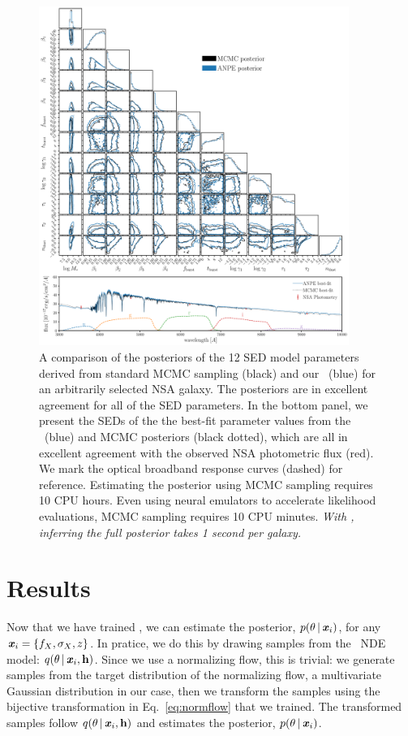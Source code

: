 \begin{figure}
\begin{center}
    \includegraphics[width=0.9\textwidth]{figs/corner.pdf}
    \caption{\label{fig:corner}
    A comparison of the posteriors of the 12 SED model parameters derived from
    standard MCMC sampling (black) and our \sedflow~(blue) for an arbitrarily
    selected NSA galaxy.
    The posteriors are in excellent agreement for all of the SED parameters. 
    In the bottom panel, we present the SEDs of the the best-fit parameter
    values from the \sedflow~(blue) and MCMC posteriors (black dotted), which
    are all in excellent agreement with the observed NSA photometric flux
    (red). 
    We mark the optical broadband response curves (dashed) for reference. 
    Estimating the posterior using MCMC sampling requires 10 CPU hours. 
    Even using neural emulators to accelerate likelihood evaluations, MCMC
    sampling requires 10 CPU minutes. 
    \emph{With \sedflow, inferring the full posterior takes 1 second per
    galaxy.}
    }
\end{center}
\end{figure}

\section{Results} \label{sec:results}
Now that we have trained \sedflow, we can estimate the posterior,
$p(\theta\,|\, \textbf{\textit{x}}_i)$, for any $\textbf{\textit{x}}_i = \{f_X, \sigma_X, z \}$. 
In pratice, we do this by drawing samples from the \sedflow~NDE model:
$q(\theta\,|\, \textbf{\textit{x}}_i, {\bf h})$. 
Since we use a normalizing flow, this is trivial:
we generate samples from the target distribution of the normalizing flow,  a
multivariate Gaussian distribution in our case, then we transform the samples
using the bijective transformation in Eq.~\ref{eq:normflow} that we trained.
The transformed samples follow $q(\theta\,|\, \textbf{\textit{x}}_i, {\bf h})$ and 
estimates the posterior, $p(\theta\,|\, \textbf{\textit{x}}_i)$. 

